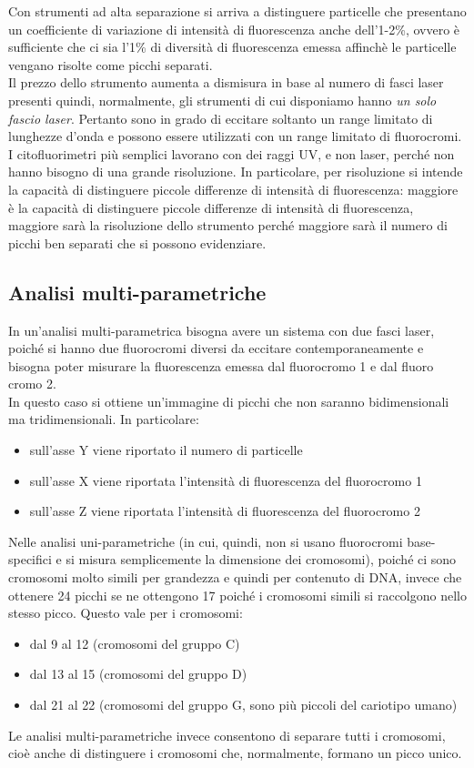 \documentclass[11pt]{book}
\begin{document}
Con strumenti ad alta separazione si arriva a distinguere particelle che presentano un coefficiente di variazione di intensità di fluorescenza anche dell’1-2\%, ovvero è sufficiente che ci sia l’1\% di diversità di fluorescenza emessa affinchè le particelle vengano risolte come picchi separati.\\

Il prezzo dello strumento aumenta a dismisura in base al numero di fasci laser presenti quindi, normalmente, gli strumenti di cui disponiamo hanno \emph{un solo fascio laser}. Pertanto sono in grado di eccitare soltanto un range limitato di lunghezze d’onda e possono essere utilizzati con un range limitato di fluorocromi.\\
I citofluorimetri più semplici lavorano con dei raggi UV, e non laser, perché non hanno bisogno di una grande risoluzione. In particolare, per risoluzione si intende la capacità di distinguere piccole differenze di intensità di fluorescenza: maggiore è la capacità di distinguere piccole differenze di intensità di fluorescenza, maggiore sarà la risoluzione dello strumento perché maggiore sarà il numero di picchi ben separati che si possono evidenziare.

\subsection{Analisi multi-parametriche}
In un’analisi multi-parametrica bisogna avere un sistema con due fasci laser, poiché si hanno due fluorocromi diversi da eccitare contemporaneamente e bisogna poter misurare la fluorescenza emessa dal fluorocromo 1 e dal fluoro cromo 2.\\

In questo caso si ottiene un’immagine di picchi che non saranno bidimensionali ma tridimensionali. In particolare:
\begin{itemize}
\item sull’asse Y viene riportato il numero di particelle 
\item sull’asse X  viene riportata l’intensità di fluorescenza del fluorocromo 1
\item sull’asse Z viene riportata l’intensità di fluorescenza del fluorocromo 2
\end{itemize}

Nelle analisi uni-parametriche (in cui, quindi, non si usano fluorocromi base-specifici e si misura semplicemente la dimensione dei cromosomi), poiché ci sono cromosomi molto simili per grandezza e quindi per contenuto di DNA, invece che ottenere 24 picchi se ne ottengono 17 poiché i cromosomi simili si raccolgono nello stesso picco.
Questo vale per i cromosomi:
\begin{itemize}
\item dal 9 al 12 (cromosomi del gruppo C)
\item dal 13 al 15 (cromosomi del gruppo D)
\item dal 21 al 22 (cromosomi del gruppo G, sono più piccoli del cariotipo umano)
\end{itemize}
Le analisi multi-parametriche invece consentono di separare tutti i cromosomi, cioè anche di distinguere i cromosomi che, normalmente, formano un picco unico.
\end{document}
